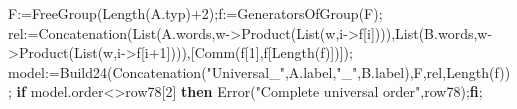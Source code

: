 \documentclass[
  10pt,
  letterpaper,
]{article}
\newenvironment{Shaded}{}{}
\newcommand{\BuiltInTok}[1]{\textcolor[rgb]{0.00,0.50,0.00}{#1}}
\newcommand{\ControlFlowTok}[1]{\textcolor[rgb]{0.00,0.44,0.13}{\textbf{#1}}}
\newcommand{\FloatTok}[1]{\textcolor[rgb]{0.25,0.63,0.44}{#1}}
\newcommand{\NormalTok}[1]{#1}
\newcommand{\OperatorTok}[1]{\textcolor[rgb]{0.40,0.40,0.40}{#1}}
\newcommand{\StringTok}[1]{\textcolor[rgb]{0.25,0.44,0.63}{#1}}
\newcommand{\VariableTok}[1]{\textcolor[rgb]{0.10,0.09,0.49}{#1}}
\begin{document}
\begin{Shaded}
\begin{Highlighting}[]
  \VariableTok{F}\OperatorTok{:=}\BuiltInTok{FreeGroup}\NormalTok{(}\BuiltInTok{Length}\NormalTok{(}\VariableTok{A}\NormalTok{.}\VariableTok{typ}\NormalTok{)}\OperatorTok{+}\FloatTok{2}\NormalTok{)}\OperatorTok{;}\VariableTok{f}\OperatorTok{:=}\BuiltInTok{GeneratorsOfGroup}\NormalTok{(}\VariableTok{F}\NormalTok{)}\OperatorTok{;}
  \VariableTok{rel}\OperatorTok{:=}\BuiltInTok{Concatenation}\NormalTok{(}\BuiltInTok{List}\NormalTok{(}\VariableTok{A}\NormalTok{.}\VariableTok{words}\OperatorTok{,}\VariableTok{w}\OperatorTok{{-}\textgreater{}}\BuiltInTok{Product}\NormalTok{(}\BuiltInTok{List}\NormalTok{(}\VariableTok{w}\OperatorTok{,}\VariableTok{i}\OperatorTok{{-}\textgreater{}}\VariableTok{f}\NormalTok{[}\VariableTok{i}\NormalTok{])))}\OperatorTok{,}\BuiltInTok{List}\NormalTok{(}\VariableTok{B}\NormalTok{.}\VariableTok{words}\OperatorTok{,}\VariableTok{w}\OperatorTok{{-}\textgreater{}}\BuiltInTok{Product}\NormalTok{(}\BuiltInTok{List}\NormalTok{(}\VariableTok{w}\OperatorTok{,}\VariableTok{i}\OperatorTok{{-}\textgreater{}}\VariableTok{f}\NormalTok{[}\VariableTok{i}\OperatorTok{+}\FloatTok{1}\NormalTok{])))}\OperatorTok{,}\NormalTok{[}\BuiltInTok{Comm}\NormalTok{(}\VariableTok{f}\NormalTok{[}\FloatTok{1}\NormalTok{]}\OperatorTok{,}\VariableTok{f}\NormalTok{[}\BuiltInTok{Length}\NormalTok{(}\VariableTok{f}\NormalTok{)])])}\OperatorTok{;}
  \VariableTok{model}\OperatorTok{:=}\VariableTok{Build24}\NormalTok{(}\BuiltInTok{Concatenation}\NormalTok{(}\StringTok{"Universal\_"}\OperatorTok{,}\VariableTok{A}\NormalTok{.}\VariableTok{label}\OperatorTok{,}\StringTok{"\_"}\OperatorTok{,}\VariableTok{B}\NormalTok{.}\VariableTok{label}\NormalTok{)}\OperatorTok{,}\VariableTok{F}\OperatorTok{,}\VariableTok{rel}\OperatorTok{,}\BuiltInTok{Length}\NormalTok{(}\VariableTok{f}\NormalTok{))}\OperatorTok{;}
  \ControlFlowTok{if} \VariableTok{model}\NormalTok{.}\VariableTok{order}\OperatorTok{\textless{}\textgreater{}}\VariableTok{row78}\NormalTok{[}\FloatTok{2}\NormalTok{] }\ControlFlowTok{then} \BuiltInTok{Error}\NormalTok{(}\StringTok{"Complete universal order"}\OperatorTok{,}\VariableTok{row78}\NormalTok{)}\OperatorTok{;}\ControlFlowTok{fi}\OperatorTok{;}

\end{Highlighting}
\end{Shaded}
\end{document}
